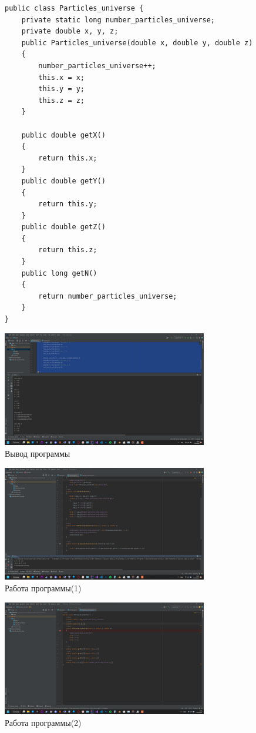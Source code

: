 \documentclass[a4paper, 14pt]{extarticle}
\begin{document}
\begin{figure}[!htb]
\begin{lstlisting}[language={},caption={Нахождение расстояния между двумя вселенными (Класс Particles)(продолжение)},label={lst:code5}]
public class Particles_universe {
    private static long number_particles_universe;
    private double x, y, z;
    public Particles_universe(double x, double y, double z)
    {
        number_particles_universe++;
        this.x = x;
        this.y = y;
        this.z = z;
    }

    public double getX()
    {
        return this.x;
    }
    public double getY()
    {
        return this.y;
    }
    public double getZ()
    {
        return this.z;
    }
    public long getN()
    {
        return number_particles_universe;
    }
}

\end{lstlisting}
\end{figure}

\begin{figure}[!htb]
	\centering
	\includegraphics[width=0.8\textwidth]{picture_1.png}
\caption{Вывод программы}
\label{fig:picture_1.png}
\end{figure}

\begin{figure}[!htb]
	\centering
	\includegraphics[width=0.8\textwidth]{picture_2.png}
\caption{Работа программы(1)}
\label{fig:picture_2.png}
\end{figure}

\begin{figure}[!htb]
	\centering
	\includegraphics[width=0.8\textwidth]{picture_3.png}
\caption{Работа программы(2)}
\label{fig:picture_3.png}
\end{figure}
\end{document}
